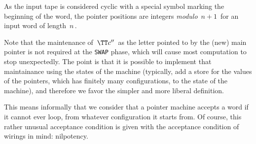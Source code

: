 \smallskip
As the input tape is considered cyclic with a special symbol marking the beginning of the word, the pointer positions are integers \emph{modulo} $\,n+1\,$ for an input word of length $\,n\,$.


Note that the maintenance of $\,\TT c''\,$ as the letter pointed to by the (new) main pointer is not required at the \texttt{SWAP} phase, which will cause most computation to stop unexpectedly.
The point is that it is possible to implement that maintainance using the states of the machine (typically, add a store for the values of the pointers, which has finitely many configurations, to the state of the machine), and therefore we favor the simpler and more liberal definition.


This means informally that we consider that a pointer machine accepts a word if it cannot ever loop, from whatever configuration it starts from.
Of course, this rather unusual acceptance condition is given with the acceptance condition of wirings in mind: nilpotency.

